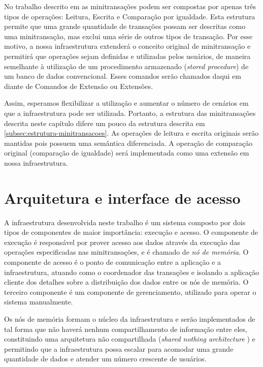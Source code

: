 \documentclass[11pt,twoside,a4paper]{book}
\begin{document}
No trabalho descrito em \cite{sinfonia} as minitransações podem ser compostas por apenas três tipos de operações: Leitura, Escrita e Comparação por igualdade. Esta estrutura permite que uma grande quantidade de transações possam ser descritas como uma minitransação, mas exclui uma série de outros tipos de transação. Por esse motivo, a nossa infraestrutura extenderá o conceito original de minitransação e permitirá que operações sejam definidas e utilizadas pelos usuários, de maneira semelhante à utilização de um procedimento armazenado (\emph{stored procedure}) de um banco de dados convencional. Esses comandos serão chamados daqui em diante de Comandos de Extensão ou Extensões.

Assim, esperamos flexibilizar a utilização e aumentar o número de cenários em que a infraestrutura pode ser utilizada. Portanto, a estrutura das minitransações descrita neste capítulo difere um pouco da estrutura descrita em \ref{subsec:estrutura-minitransacoes}. As operações de leitura e escrita originais serão mantidas pois possuem uma semântica diferenciada. A operação de comparação original (comparação de igualdade) será implementada como uma extensão em nossa infraestrutura.

\section{Arquitetura e interface de acesso}
\label{sec:arquitetura}

A infraestrutura desenvolvida neste trabalho é um sistema composto por dois tipos de componentes de maior importância: execução e acesso. O componente de execução é responsável por prover acesso aos dados através da execução das operações especificadas nas minitransações, e é chamado de \emph{nó de memória}. O componente de acesso é o ponto de comunicação entre a aplicação e a infraestrutura, atuando como o coordenador das transações e isolando a aplicação cliente dos detalhes sobre a distribuição dos dados entre os nós de memória. O terceiro componente é um componente de gerenciamento, utilizado para operar o sistema manualmente.

Os nós de memória formam o núcleo da infraestrutura e serão implementados de tal forma que não haverá nenhum compartilhamento de informação entre eles, constituindo uma arquitetura não compartilhada (\emph{shared nothing architecture} \cite{shared_nothing}) e permitindo que a infraestrutura possa escalar para acomodar uma grande quantidade de dados e atender um número crescente de usuários.
\end{document}
